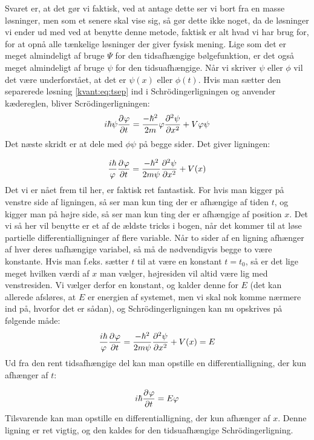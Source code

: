 \documentclass[../Kvantemekanik.tex]{subfiles}
\begin{document}
Svaret er, at det gør vi faktisk, ved at antage dette ser vi bort fra en masse løsninger, men som et senere skal vise sig, så gør dette ikke noget, da de løsninger vi ender ud med ved at benytte denne metode, faktisk er alt hvad vi har brug for, for at opnå alle tænkelige løsninger der giver fysisk mening. 
Lige som det er meget almindeligt af bruge $\Psi$ for den tidsafhængige bølgefunktion, er det også meget almindeligt af bruge $\psi$ for den tidsuafhængige. Når vi skriver $\psi$ eller $\phi$ vil det være underforstået, at det er $\psi(x)$ eller $\phi(t)$.
Hvis man sætter den separerede løsning \eqref{kvant:eq:tsep} ind i Schrödingerligningen og anvender kædereglen, bliver Scrödingerligningen:
\begin{equation}
i\hbar \psi \pdif{t}\phi = \frac{-\hbar^2}{2m}\phi\pdif[2]{x}\psi+V\phi\psi
\end{equation}
Det næste skridt er at dele med $\phi\psi$ på begge sider. Det giver ligningen:

\begin{equation}
\frac{i\hbar}{\phi} \pdif{t}\phi = \frac{-\hbar^2}{2m\psi}\pdif[2]{x}\psi+V(x)
\end{equation}
Det vi er nået frem til her, er faktisk ret fantastisk. For hvis man kigger på venstre side af ligningen, så ser man kun ting der er afhængige af tiden $t$, og kigger man på højre side, så ser man kun ting der er afhængige af position $x$. Det vi så her vil benytte er et af de ældste tricks i bogen, når det kommer til at løse partielle differentialligninger af flere variable. Når to sider af en ligning afhænger af hver deres uafhængige variabel, så må de nødvendigvis begge to være konstante. Hvis man f.eks. sætter $t$ til at være en konstant $t=t_0$, så er det lige meget hvilken værdi af $x$ man vælger, højresiden vil altid være lig med venstresiden.
Vi vælger derfor en konstant, og kalder denne for $E$ (det kan allerede afsløres, at $E$ er energien af systemet, men vi skal nok komme nærmere ind på, hvorfor det er sådan), og Schrödingerligningen kan nu opskrives på følgende måde:
\begin{equation}
\frac{i\hbar}{\phi} \pdif{t}\phi = \frac{-\hbar^2}{2m\psi}\pdif[2]{x}\psi+V(x) = E
\end{equation}
Ud fra den rent tidsafhængige del kan man opstille en differentialligning, der kun afhænger af $t$:

\begin{equation}
i\hbar\pdif{t}\phi = E\phi
\end{equation}
Tilsvarende kan man opstille en differentialligning, der kun afhænger af $x$. Denne ligning er ret vigtig, og den kaldes for den tidsuafhængige Schrödingerligning.
\end{document}
